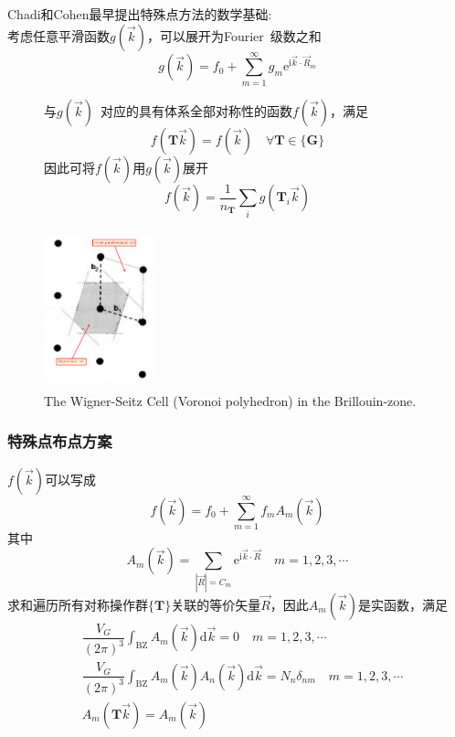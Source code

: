 {{	\textrm{Chadi}和\textrm{Cohen}最早提出特殊点方法的数学基础:\\
	考虑任意平滑函数$g(\vec k)$，可以展开为\textrm{Fourier}~级数之和
	$$g(\vec k)=f_0+\sum_{m=1}^{\infty}g_m\mathrm{e}^{\mathrm{i}\vec k\cdot\vec R_m}$$
\begin{figure}[h!]
\begin{minipage}[t]{0.55\linewidth}
	与$g(\vec k)$~对应的具有体系全部对称性的函数$f(\vec k)$，满足
	$$f(\mathbf{T}\vec k)=f(\vec k)\quad\forall\mathbf{T}\in\{\mathbf{G}\}$$
	因此可将$f(\vec k)$用$g(\vec k)$展开
	$$f(\vec k)=\dfrac1{n_{\mathbf{T}}}\sum\limits_ig(\mathbf{T}_i\vec k)$$
\end{minipage}
\hfill
\begin{minipage}[t]{0.42\linewidth}
\centering
\vspace*{-0.5in}
\includegraphics[height=1.8in,width=1.25in,viewport=20 20 530 800,clip]{Figures/Reciprocal-WS.png}
\caption{\tiny \textrm{The Wigner-Seitz Cell (Voronoi polyhedron) in the Brillouin-zone.}}%
\label{Reciprocal-WS}
\end{minipage}
\end{figure} 
}

\frame
{
	\frametitle{特殊点布点方案}
	$f(\vec k)$可以写成
	$$f(\vec k)=f_0+\sum_{m=1}^{\infty}f_mA_m(\vec k)$$其中
	$$A_m(\vec k)=\sum_{|\vec R|=C_m}\mathrm{e}^{\mathrm{i}\vec k\cdot\vec R}\quad m=1,2,3,\cdots$$
	求和遍历所有对称操作群$\{\mathbf{T}\}$关联的等价矢量$\vec R$，因此$A_m(\vec k)$是实函数，满足
	\begin{displaymath}
		\begin{aligned}
			&\dfrac{V_G}{(2\pi)^3}\int_{\mathrm{BZ}}A_m(\vec k)\mathrm{d}\vec k=0\quad m=1,2,3,\cdots\\
			&\dfrac{V_G}{(2\pi)^3}\int_{\mathrm{BZ}}A_m(\vec k)A_n(\vec k)\mathrm{d}\vec k=N_n\delta_{nm}\quad m=1,2,3,\cdots\\
			&A_m(\mathbf{T}\vec k)=A_m(\vec k)
		\end{aligned}
	\end{displaymath}
}

}
